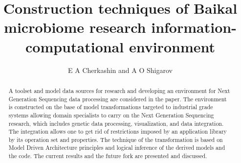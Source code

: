 \documentclass[a4paper]{jpconf}
\begin{document}
\title{Construction techniques of Baikal microbiome research information-computational environment}

\author{E A Cherkashin and A O Shigarov}

\address{Matrosov Institute for System Dynamics and Control Theory, Siberian Branch\\ of Russian Academy of Sciences, Irkutsk, Russia,\\
Irkutsk Scientific Center, Siberian Branch of Russian Academy of Sciences, Irkutsk, Russia}





\begin{abstract}%
A toolset and model data sources for research and developing an environment for Next Generation Sequencing data processing are considered in the paper.  The environment is constructed on the base of model transformations targeted to industrial grade systems allowing domain specialists to carry on the Next Generation Sequencing research, which includes genetic data processing, visualization, and data integration.  The integration allows one to get rid of restrictions imposed by an application library by its operation set and properties.  The technique of the transformation is based on Model Driven Architecture principles and logical inference of the derived models and the code.  The current results and the future fork are presented and discussed.
\end{abstract}
\end{document}
